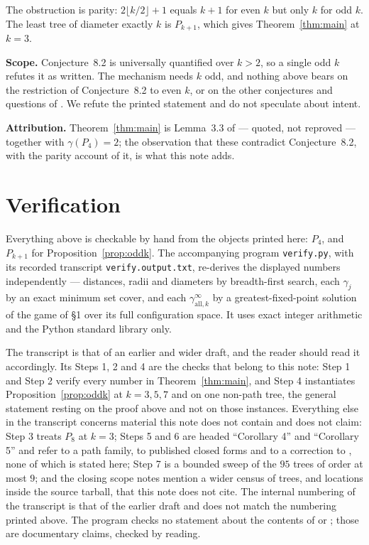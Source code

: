 \documentclass[11pt]{amsart}
\begin{document}
The obstruction is parity: $2\lfloor k/2\rfloor+1$ equals $k+1$ for even $k$ but
only $k$ for odd $k$. The least tree of diameter exactly $k$ is $P_{k+1}$, which
gives Theorem~\ref{thm:main} at $k=3$.

\medskip
\noindent\textbf{Scope.} Conjecture~8.2 is universally quantified over $k>2$, so
a single odd $k$ refutes it as written. The mechanism needs $k$ odd, and nothing
above bears on the restriction of Conjecture~8.2 to even $k$, or on the other
conjectures and questions of \cite[\S8]{CvB}. We refute the printed statement
and do not speculate about intent.

\medskip
\noindent\textbf{Attribution.} Theorem~\ref{thm:main} is Lemma~3.3 of
\cite{CvB} --- quoted, not reproved --- together with $\gamma(P_4)=2$; the
observation that these contradict Conjecture~8.2, with the parity account of
it, is what this note adds.

\section{Verification}

Everything above is checkable by hand from the objects printed here: $P_4$, and
$P_{k+1}$ for Proposition~\ref{prop:oddk}. The accompanying program
\texttt{verify.py}, with its recorded transcript \texttt{verify.output.txt},
re-derives the displayed numbers independently --- distances, radii and
diameters by breadth-first search, each $\gamma_j$ by an exact minimum set
cover, and each $\gamma_{\mathrm{all},k}^{\infty}$ by a greatest-fixed-point
solution of the game of \S1 over its full configuration space. It uses exact
integer arithmetic and the Python standard library only.

The transcript is that of an earlier and wider draft, and the reader should
read it accordingly. Its Steps 1, 2 and 4 are the checks that belong to this
note: Step 1 and Step 2 verify every number in Theorem~\ref{thm:main}, and
Step 4 instantiates Proposition~\ref{prop:oddk} at $k=3,5,7$ and on one
non-path tree, the general statement resting on the proof above and not on
those instances. Everything else in the transcript concerns material this note
does not contain and does not claim: Step 3 treats $P_8$ at $k=3$; Steps 5
and 6 are headed ``Corollary 4'' and ``Corollary 5'' and refer to a path family,
to published closed forms and to a correction to \cite{CMM}, none of which is
stated here; Step 7 is a bounded sweep of the $95$ trees of order at most $9$;
and the closing scope notes mention a wider census of trees, and locations
inside the source tarball, that this note does not cite. The internal numbering
of the transcript is that of the earlier draft and does not match the numbering
printed above. The program checks no statement about the contents of \cite{CvB}
or \cite{CMM}; those are documentary claims, checked by reading.
\end{document}
